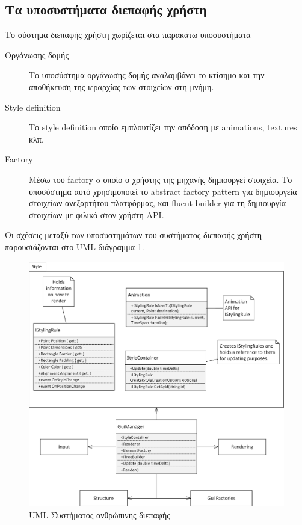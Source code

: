\subsection{Τα υποσυστήματα διεπαφής χρήστη}	
Το σύστημα διεπαφής χρήστη χωρίζεται στα παρακάτω υποσυστήματα
	\begin{description}
		\item [Οργάνωσης δομής] Το υποσύστημα οργάνωσης δομής αναλαμβάνει το κτίσημο και την αποθήκευση της ιεραρχίας των στοιχείων στη μνήμη.
		\item [Style definition] Το style definition οποίο εμπλουτίζει την απόδοση με animations, textures κλπ.
		\item [Factory] Μέσω του factory o οποίο ο χρήστης της μηχανής δημιουργεί στοιχεία. Το υποσύστημα αυτό χρησιμοποιεί το abstract factory pattern \cite{Gamma:1995:DPE:186897} για δημιουργεία στοιχείων ανεξαρτήτου πλατφόρμας, και fluent builder για τη δημιουργία στοιχείων με φιλικό στον χρήστη \gls{API}.
	\end{description}
	
Οι σχέσεις μεταξύ των υποσυστημάτων του συστήματος διεπαφής χρήστη παρουσιάζονται στο \gls{UML} διάγραμμα \ref{fig:ui_system}.
	\begin{figure}[h!]
		\centering
		\includegraphics[width=165mm]{Images/gui_system}
		\caption{UML Συστήματος ανθρώπινης διεπαφής}
		\label{fig:ui_system}
	\end{figure}	
	
